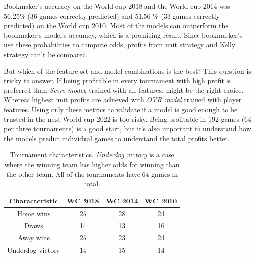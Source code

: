 Bookmaker's accuracy on the World cup 2018 and the World cup 2014 was 56.25\% (36 games correctly predicted) and 51.56  \% (33 games correctly predicted) on the World cup 2010. Most of the models can outperform the bookmaker's model's accuracy, which is a promising result. Since bookmarker's use these probabilities to compute odds, profits from unit strategy and Kelly strategy can't be compared.

But which of the feature set and model combinations is the best? This question is tricky to answer. If being profitable in every tournament with high profit is preferred than \textit{Score model}, trained with all features, might be the right choice. Whereas highest unit profits are achieved with \textit{OVR model} trained with player features. Using only these metrics to validate if a model is good enough to be trusted in the next World cup 2022 is too risky. Being profitable in 192 games (64 per three tournaments) is a good start, but it's also important to understand how the models predict individual games to understand the total profits better.

\begin{table}
    \caption{Tournament characteristics. \textit{Underdog victory} is a case where the winning team has higher odds for winning than the other team. All of the tournaments have 64 games in total.}
    \begin{tabular}{| c | c|c | c|}
        \hline
        Characteristic & \textbf{WC 2018} & \textbf{WC 2014} & \textbf{WC 2010}\\
        \hline
        Home wins & 25 & 28 & 24\\
        Draws & 14 & 13 & 16\\
        Away wins & 25 & 23 & 24\\
        Underdog victory  & 14 & 15 & 14\\
        \hline
    \end{tabular}
    \label{table:tournamentcharacteristics}
\end{table}


